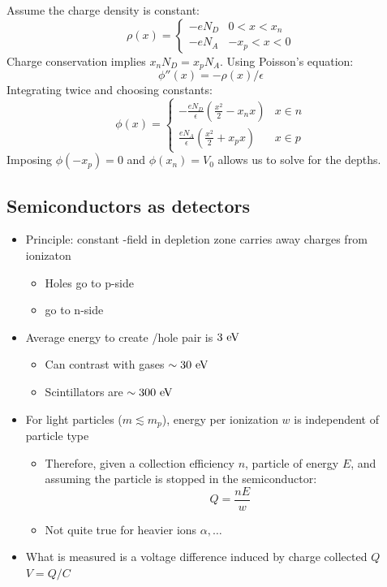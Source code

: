 \noindent Assume the charge density is constant:
\begin{equation}
  \rho(x) = \begin{cases} - eN_D & 0 < x < x_n \\ - eN_A & -x_p < x < 0 \end{cases}
\end{equation}
Charge conservation implies $x_n N_D = x_p N_A$.  Using Poisson's equation:
\begin{equation}
  \phi''(x) = -\rho(x)/\epsilon
\end{equation}
Integrating twice and choosing constants:
\begin{equation}
  \phi(x) = \begin{cases} - \frac{eN_D}{\epsilon} \left(\frac{x^2}{2}-x_n x\right) & x\in n \\ \frac{eN_A}{\epsilon} \left(\frac{x^2}{2}+x_px\right) & x\in p \end{cases}
\end{equation}
Imposing $\phi(-x_p)=0$ and $\phi(x_n)=V_0$ allows us to solve for the depths.

\subsection{Semiconductors as detectors}
\begin{itemize}
  \item Principle: constant \E-field in depletion zone carries away charges from ionizaton
  \begin{itemize}
    \item Holes go to p-side
    \item \el go to n-side
  \end{itemize}
  \item Average energy to create \el/hole pair is $3~\text{eV}$
  \begin{itemize}
    \item Can contrast with gases $\sim30~\text{eV}$
    \item Scintillators are $\sim300~\text{eV}$
  \end{itemize}
  \item For light particles ($m\lesssim m_p$), energy per ionization $w$ is independent of particle type
  \begin{itemize}
    \item Therefore, given a collection efficiency $n$, particle of energy $E$, and assuming the particle is stopped in the semiconductor:
    \begin{equation}
      Q = \frac{nE}{w}
    \end{equation}
    \item Not quite true for heavier ions $\alpha,\dots$
  \end{itemize}
  \item What is measured is a voltage difference induced by charge collected $Q$ \thus $V=Q/C$
\end{itemize}

